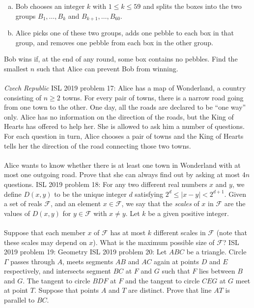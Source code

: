 \begin{enumerate}[(a)]
  \item Bob chooses an integer $k$ with $1\leq k\leq 59$ and splits the boxes into the two groups $B_1,\ldots,B_k$ and $B_{k+1},\ldots,B_{60}$.
  \item Alice picks one of these two groups, adds one pebble to each box in that group, and removes one pebble from each box in the other group.
\end{enumerate}
Bob wins if, at the end of any round, some box contains no pebbles. Find the smallest $n$ such that Alice can prevent Bob from winning. \\\\
\textit{Czech Republic} 
ISL 2019 problem 17:  Alice has a map of Wonderland, a country consisting of $n \geq 2$ towns. For every pair of towns, there is a narrow road going from one town to the other. One day, all the roads are declared to be “one way” only. Alice has no information on the direction of the roads, but the King of Hearts has offered to help her. She is allowed to ask him a number of questions. For each question in turn, Alice chooses a pair of towns and the King of Hearts tells her the direction of the road connecting those two towns. \\\\
Alice wants to know whether there is at least one town in Wonderland with at most one outgoing road. Prove that she can always find out by asking at most $4n$ questions. 
ISL 2019 problem 18:  For any two different real numbers $x$ and $y$, we define $D(x,y)$ to be the unique integer $d$ satisfying $2^d\le |x-y| < 2^{d+1}$. Given a set of reals $\mathcal F$, and an element $x\in \mathcal F$, we say that the \textit{scales} of $x$ in $\mathcal F$ are the values of $D(x,y)$ for $y\in\mathcal F$ with $x\neq y$. Let $k$ be a given positive integer. \\\\
Suppose that each member $x$ of $\mathcal F$ has at most $k$ different scales in $\mathcal F$ (note that these scales may depend on $x$). What is the maximum possible size of $\mathcal F$? 
ISL 2019 problem 19:  Geometry 
ISL 2019 problem 20:  Let $ABC$ be a triangle. Circle $\Gamma$ passes through $A$, meets segments $AB$ and $AC$ again at points $D$ and $E$ respectively, and intersects segment $BC$ at $F$ and $G$ such that $F$ lies between $B$ and $G$. The tangent to circle $BDF$ at $F$ and the tangent to circle $CEG$ at $G$ meet at point $T$. Suppose that points $A$ and $T$ are distinct. Prove that line $AT$ is parallel to $BC$. \\\\
